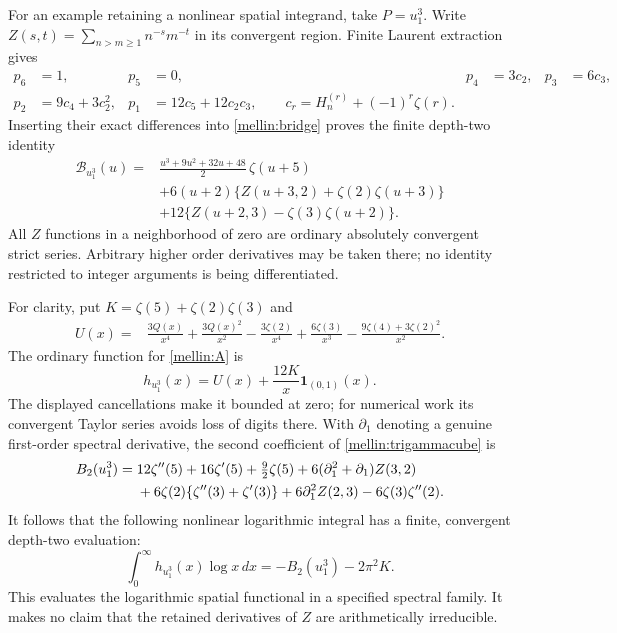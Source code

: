 \documentclass[11pt,letterpaper]{article}
\theoremstyle{definition}
\theoremstyle{remark}
\numberwithin{equation}{section}
\begin{document}
For an example retaining a nonlinear spatial integrand, take $P=u_1^3$.
Write $Z(s,t)=\sum_{n>m\ge1}n^{-s}m^{-t}$ in its convergent region.
Finite Laurent extraction gives
\begin{align*}
 p_6&=1,&p_5&=0,&p_4&=3c_2,&p_3&=6c_3,\\
 p_2&=9c_4+3c_2^2,&p_1&=12c_5+12c_2c_3,
 \qquad c_r=H_n^{(r)}+(-1)^r\zeta(r).
\end{align*}
Inserting their exact differences into \eqref{mellin:bridge} proves
the finite depth-two identity
\begin{equation}\label{mellin:trigammacube}
 \boxed{\begin{aligned}
 \mathcal B_{u_1^3}(u)={}&
 \frac{u^3+9u^2+32u+48}{2}\,\zeta(u+5)\\
 &+6(u+2)\{Z(u+3,2)+\zeta(2)\zeta(u+3)\}\\
 &+12\{Z(u+2,3)-\zeta(3)\zeta(u+2)\}.
 \end{aligned}}
\end{equation}
All $Z$ functions in a neighborhood of zero are ordinary absolutely
convergent strict series.  Arbitrary higher order derivatives may be
taken there; no identity restricted to integer arguments is being
differentiated.

For clarity, put $K=\zeta(5)+\zeta(2)\zeta(3)$ and
\begin{align*}
 U(x)={}&\frac{3Q(x)}{x^4}+\frac{3Q(x)^2}{x^2}
 -\frac{3\zeta(2)}{x^4}+\frac{6\zeta(3)}{x^3}
 -\frac{9\zeta(4)+3\zeta(2)^2}{x^2}.
\end{align*}
The ordinary function for \eqref{mellin:A} is
\[
 h_{u_1^3}(x)=U(x)+\frac{12K}{x}\mathbf1_{(0,1)}(x).
\]
The displayed cancellations make it bounded at zero; for numerical
work its convergent Taylor series avoids loss of digits there.
With $\partial_1$ denoting a genuine first-order spectral derivative,
the second coefficient of \eqref{mellin:trigammacube} is
\begin{align}
 B_2(u_1^3)={}&12\zeta''(5)+16\zeta'(5)+\tfrac92\zeta(5)
 +6(\partial_1^2+\partial_1)Z(3,2)\notag\\
 &+6\zeta(2)\{\zeta''(3)+\zeta'(3)\}
 +6\partial_1^2 Z(2,3)-6\zeta(3)\zeta''(2).
 \label{mellin:cube-B2}
\end{align}
It follows that the following nonlinear logarithmic integral has a
finite, convergent depth-two evaluation:
\begin{equation}\label{mellin:cube-log}
 \boxed{\int_0^\infty h_{u_1^3}(x)\log x\,dx
                  =-B_2(u_1^3)-2\pi^2K.}
\end{equation}
This evaluates the logarithmic spatial functional in a specified
spectral family.  It makes no claim that the retained derivatives
of $Z$ are arithmetically irreducible.
\end{document}
